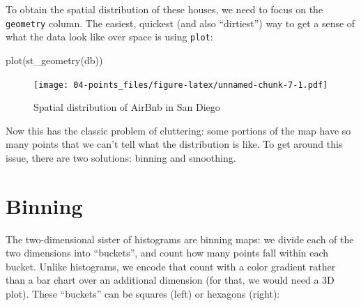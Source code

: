 \documentclass[
]{book}
\newenvironment{Shaded}{\begin{snugshade}}{\end{snugshade}}
\newcommand{\FunctionTok}[1]{\textcolor[rgb]{0.00,0.00,0.00}{#1}}
\newcommand{\NormalTok}[1]{#1}
\begin{document}
To obtain the spatial distribution of these houses, we need to focus on the \texttt{geometry} column. The easiest, quickest (and also ``dirtiest'') way to get a sense of what the data look like over space is using \texttt{plot}:

\begin{Shaded}
\begin{Highlighting}[]
\FunctionTok{plot}\NormalTok{(}\FunctionTok{st\_geometry}\NormalTok{(db))}
\end{Highlighting}
\end{Shaded}

\begin{figure}
\centering
\texttt{[image: 04-points\_files/figure-latex/unnamed-chunk-7-1.pdf]}
\caption{\label{fig:unnamed-chunk-7}Spatial distribution of AirBnb in San Diego}
\end{figure}

Now this has the classic problem of cluttering: some portions of the map have so many points that we can't tell what the distribution is like. To get around this issue, there are two solutions: binning and smoothing.

\hypertarget{binning}{%
\section{Binning}\label{binning}}

The two-dimensional sister of histograms are binning maps: we divide each of the two dimensions into ``buckets'', and count how many points fall within each bucket. Unlike histograms, we encode that count with a color gradient rather than a bar chart over an additional dimension (for that, we would need a 3D plot). These ``buckets'' can be squares (left) or hexagons (right):
\end{document}
